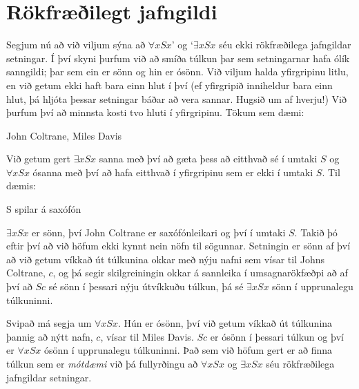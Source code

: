 \section{Rökfræðilegt jafngildi}

Segjum nú að við viljum sýna að $\forall x Sx$' og `$\exists x Sx$ séu ekki rökfræðilega jafngildar setningar. Í því skyni þurfum við að smíða túlkun þar sem setningarnar hafa ólík sanngildi; þar sem ein er sönn og hin er ósönn. Við viljum halda yfirgripinu litlu, en við getum ekki haft bara einn hlut í því (ef yfirgripið inniheldur bara einn hlut, þá hljóta þessar setningar báðar að vera sannar. Hugsið um af hverju!) Við þurfum því að minnsta kosti tvo hluti í yfirgripinu. Tökum sem dæmi:
	\begin{ekey}
		\item[\text{yfirgrip}] John Coltrane, Miles Davis
	\end{ekey}
Við getum gert $\exists x Sx$ sanna með því að gæta þess að eitthvað sé í umtaki $S$ og $\forall x Sx$ ósanna með því að hafa eitthvað í yfirgripinu sem er ekki í umtaki $S$. Til dæmis:
	\begin{ekey}
		\item[S]  spilar á saxófón
	\end{ekey}
$\exists x Sx$ er sönn, því John Coltrane er saxófónleikari og því í umtaki $S$. Takið þó eftir því að við höfum ekki kynnt nein nöfn til sögunnar. Setningin er sönn af því að við getum víkkað út túlkunina okkar með nýju nafni sem vísar til Johns Coltrane, $c$, og þá segir skilgreiningin okkar á sannleika í umsagnarökfæðpi að af því að $Sc$ sé sönn í þessari nýju útvíkkuðu túlkun, þá sé $\exists x Sx$ sönn í upprunalegu túlkuninni.

Svipað má segja um $\forall x Sx$. Hún er ósönn, því við getum víkkað út túlkunina þannig að nýtt nafn, $c$, vísar til Miles Davis. $Sc$ er ósönn í þessari túlkun og því er $\forall x Sx$ ósönn í upprunalegu túlkuninni. Það sem við höfum gert er að finna túlkun sem er \emph{mótdæmi} við þá fullyrðingu að $\forall x Sx$ og $\exists x Sx$ séu rökfræðilega jafngildar setningar.
	

